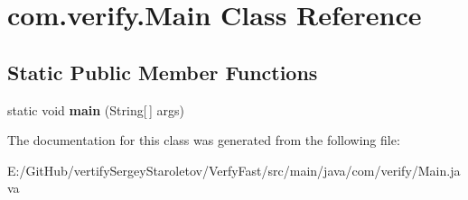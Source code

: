 \hypertarget{classcom_1_1verify_1_1_main}{}\section{com.\+verify.\+Main Class Reference}
\label{classcom_1_1verify_1_1_main}
\subsection*{Static Public Member Functions}
\begin{DoxyCompactItemize}
\item 
\mbox{\label{classcom_1_1verify_1_1_main_a34fb765b1486799b1f4540b49b63f3d2}} 
static void {\bfseries main} (String\mbox{[}$\,$\mbox{]} args)
\end{DoxyCompactItemize}


The documentation for this class was generated from the following file\+:\begin{DoxyCompactItemize}
\item 
E\+:/\+Git\+Hub/vertify\+Sergey\+Staroletov/\+Verfy\+Fast/src/main/java/com/verify/Main.\+java\end{DoxyCompactItemize}
